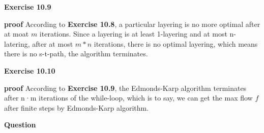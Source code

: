 \documentclass{article} %
\begin{document}
	\textbf{Exercise 10.9}\par
	\textbf{proof} According to \textbf{Exercise 10.8}, a particular layering is no more optimal after at moat $m$ iterations. Since a layering is at least 1-layering and at most n-latering, after at most $m*n$ iterations, there is no optimal layering, which means there is no s-t-path, the algorithm terminates.
	
	
	\textbf{Exercise 10.10}\par
	\textbf{proof} According to \textbf{Exercise 10.9},  the Edmonds-Karp algorithm terminates after n·m iterations of the while-loop, which is to say, we can get the max flow $f$ after finite steps by Edmonds-Karp algorithm.

		\textbf{Question}\par
	
	
\end{document}

